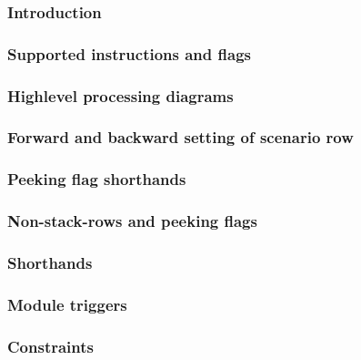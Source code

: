 
\subsubsection{Introduction}                                             \label{hub: instruction handling: create: intro}                      
\subsubsection{Supported instructions and flags}                         \label{hub: instruction handling: create: instruction flags}          
\subsubsection{Highlevel  processing diagrams}              \label{hub: instruction handling: create: high level diagram}         
\subsubsection{Forward and backward setting of scenario row \lispDone{}} \label{hub: instruction handling: create: scenario bedrock}           
\subsubsection{Peeking flag shorthands                      \lispDone{}} \label{hub: instruction handling: create: peeking flags shorthands}   
\subsubsection{Non-stack-rows and peeking flags             \lispDone{}} \label{hub: instruction handling: create: non stack rows}             
\subsubsection{Shorthands                                   \lispDone{}} \label{hub: instruction handling: create: shorthands}                 
\subsubsection{Module triggers                              \lispDone{}} \label{hub: instruction handling: create: module triggers}            
\subsubsection{Constraints                                  \lispDone{}} \label{hub: instruction handling: create: generalities}               
